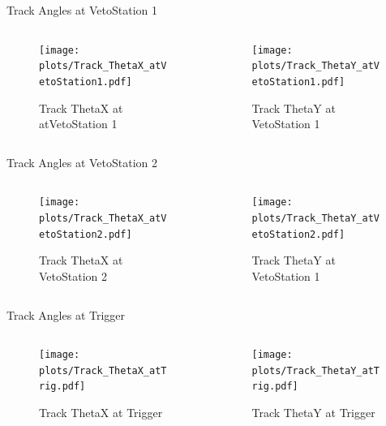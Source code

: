 \begin{subframe}{Track Angles at VetoStation 1 }
	\begin{columns}
		\begin{column}{0.5\textwidth}
			\begin{figure}
				\texttt{[image: \\plots/Track\_ThetaX\_atVetoStation1.pdf]}
				\caption{Track ThetaX at atVetoStation 1}
			\end{figure}
		\end{column}
		\begin{column}{0.5\textwidth}
			\begin{figure}
				\texttt{[image: \\plots/Track\_ThetaY\_atVetoStation1.pdf]}
				\caption{Track ThetaY at VetoStation 1}
			\end{figure}
		\end{column}
	\end{columns}
\end{subframe}

\begin{subframe}{Track Angles at VetoStation 2 }
	\begin{columns}
		\begin{column}{0.5\textwidth}
			\begin{figure}
				\texttt{[image: \\plots/Track\_ThetaX\_atVetoStation2.pdf]}
				\caption{Track ThetaX at VetoStation 2}
			\end{figure}
		\end{column}
		\begin{column}{0.5\textwidth}
			\begin{figure}
				\texttt{[image: \\plots/Track\_ThetaY\_atVetoStation2.pdf]}
				\caption{Track ThetaY at VetoStation 1}
			\end{figure}
		\end{column}
	\end{columns}
\end{subframe}

\begin{subframe}{Track Angles at Trigger }
	\begin{columns}
		\begin{column}{0.5\textwidth}
			\begin{figure}
				\texttt{[image: \\plots/Track\_ThetaX\_atTrig.pdf]}
				\caption{Track ThetaX at Trigger}
			\end{figure}
		\end{column}
		\begin{column}{0.5\textwidth}
			\begin{figure}
				\texttt{[image: \\plots/Track\_ThetaY\_atTrig.pdf]}
				\caption{Track ThetaY at Trigger}
			\end{figure}
		\end{column}
	\end{columns}
\end{subframe}

